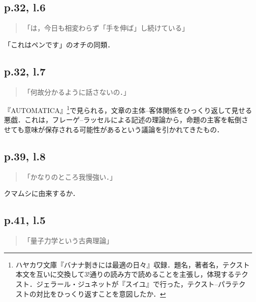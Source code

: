 \documentclass[10pt, a5paper, twoside]{jsarticle}
\theoremstyle{definition}
\begin{document}
		\subsection{p.32, l.6}

			\begin{quote}
				
				「は，今日も相変わらず「手を伸ば」し続けている」

			\end{quote}

			「これはペンです」のオチの同類．

		\subsection{p.32, l.7}

			\begin{quote}
				
				「何故分かるように話さないの．」

			\end{quote}

			『AUTOMATICA』\footnote{ハヤカワ文庫『バナナ剝きには最適の日々』収録．題名，著者名，テクスト本文を互いに交換して$3!$通りの読み方で読めることを主張し，体現するテクスト．ジェラール・ジュネットが『スイユ』で行った，テクスト--パラテクストの対比をひっくり返すことを意図したか．}で見られる，文章の主体--客体関係をひっくり返して見せる悪戯．これは，フレーゲ--ラッセルによる記述の理論から，命題の主客を転倒させても意味が保存される可能性があるという議論を引かれてきたもの．

		\subsection{p.39, l.8}

			\begin{quote}
				
				「かなりのところ我慢強い．」

			\end{quote}

			クマムシに由来するか．


		\subsection{p.41, l.5}

			\begin{quote}

				「量子力学という古典理論」
				
			\end{quote}
\end{document}

